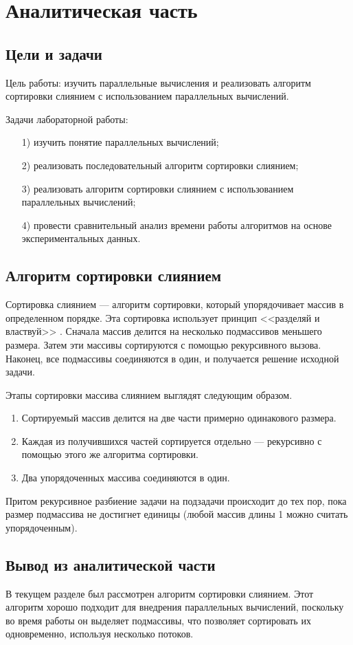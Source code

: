 \chapter{Аналитическая часть}

\section{Цели и задачи}

Цель работы: изучить параллельные вычисления и реализовать алгоритм сортировки слиянием с использованием параллельных вычислений.

Задачи лабораторной работы:

\begin{enumerate}
\item[1)]
изучить понятие параллельных вычислений;
\item[2)]
реализовать последовательный алгоритм сортировки слиянием;
\item[3)]
реализовать алгоритм сортировки слиянием с использованием параллельных вычислений;
\item[4)]
провести сравнительный анализ времени работы алгоритмов на основе экспериментальных данных.
\end{enumerate}

\section{Алгоритм сортировки слиянием}

Сортировка слиянием --- алгоритм сортировки, который упорядочивает массив в определенном порядке. 
Эта сортировка использует принцип <<разделяй и властвуй>> \cite{Cormen2011}. 
Сначала массив делится на несколько подмассивов меньшего размера. 
Затем эти массивы сортируются с помощью рекурсивного вызова. 
Наконец, все подмассивы соединяются в один, и получается решение исходной задачи.

Этапы сортировки массива слиянием выглядят следующим образом.

\begin{enumerate}
\item
Сортируемый массив делится на две части примерно одинакового размера.
\item
Каждая из получившихся частей сортируется отдельно --- рекурсивно с помощью этого же алгоритма сортировки.
\item
Два упорядоченных массива соединяются в один.
\end{enumerate}

Притом рекурсивное разбиение задачи на подзадачи происходит до тех пор, пока размер подмассива не достигнет единицы (любой массив длины 1 можно считать упорядоченным). 

\section*{Вывод из аналитической части}

В текущем разделе был рассмотрен алгоритм сортировки слиянием. 
Этот алгоритм хорошо подходит для внедрения параллельных вычислений, поскольку во время работы он выделяет подмассивы, что позволяет сортировать их одновременно, используя несколько потоков.
